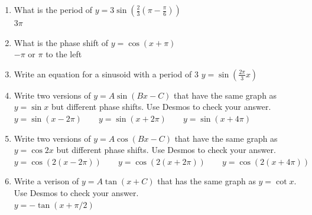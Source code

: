 \documentclass{article}
\begin{document}
\begin{multicols}{2}
\begin{enumerate}
	\setlength{\itemsep}{6ex}
	\item What is the period of $y=3 \sin (\frac23(\pi-\frac{\pi}{6}))$ \\ $3\pi$
	\item What is the phase shift of $y=\cos(x+\pi)$ \\ $-\pi$ or $\pi$ to the left
	\item Write an equation for a sinusoid with a period of 3 $y=\sin(\frac{2\pi}{3}x)$
	\item Write two versions of $y=A\sin (Bx-C)$ that have the same graph as $y=\sin x$ but
				different phase shifts. Use Desmos to check your answer. \\
				$y = \sin(x-2\pi) \qquad y = \sin(x+2\pi) \qquad y = \sin(x+4\pi)$
	\item  Write two versions of $y=A\cos (Bx-C)$ that have the same
				graph as $y=\cos 2x$ but different phase shifts.
				Use Desmos to check your answer. \\
				$y = \cos(2(x-2\pi)) \qquad y = \cos(2(x+2\pi)) \qquad y = \cos(2(x+4\pi))$

	\item Write a verison of $y=A\tan(x+C)$ that has the same graph as $y=\cot x$.
				Use Desmos to check your answer. \\
				$y = -\tan(x+\pi/2)$
\end{enumerate}


\end{multicols}
\end{document}
